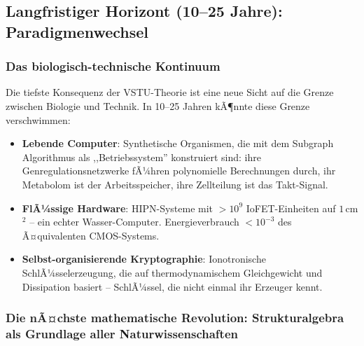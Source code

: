 ﻿\documentclass[a4paper,12pt]{scrreprt}
\theoremstyle{definition}
\begin{document}
\subsection{Langfristiger Horizont (10--25 Jahre): Paradigmenwechsel}

\subsubsection{Das biologisch-technische Kontinuum}

Die tiefste Konsequenz der VSTU-Theorie ist eine neue Sicht auf die
Grenze zwischen Biologie und Technik. In 10--25 Jahren kÃ¶nnte diese
Grenze verschwimmen:

\begin{itemize}
  \item \textbf{Lebende Computer}: Synthetische Organismen, die mit
    dem Subgraph Algorithmus als ,,Betriebssystem'' konstruiert sind:
    ihre Genregulationsnetzwerke fÃ¼hren polynomielle Berechnungen durch,
    ihr Metabolom ist der Arbeitsspeicher, ihre Zellteilung ist
    das Takt-Signal.
  \item \textbf{FlÃ¼ssige Hardware}: HIPN-Systeme mit
    $> 10^9$ IoFET-Einheiten auf $1$\,cm$^2$ -- ein echter Wasser-Computer.
    Energieverbrauch $< 10^{-3}$ des Ã¤quivalenten CMOS-Systems.
  \item \textbf{Selbst-organisierende Kryptographie}: Ionotronische
    SchlÃ¼sselerzeugung, die auf thermodynamischem Gleichgewicht und
    Dissipation basiert -- SchlÃ¼ssel, die nicht einmal ihr Erzeuger
    kennt.
\end{itemize}

\subsubsection{Die nÃ¤chste mathematische Revolution: Strukturalgebra als
Grundlage aller Naturwissenschaften}
\end{document}
